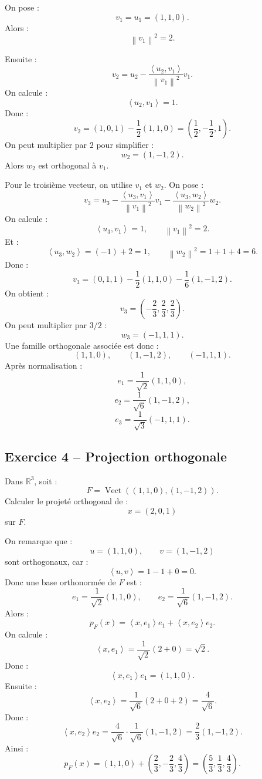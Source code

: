 \documentclass[11pt,a4paper]{article}
\newcommand{\R}{\mathbb R}
\newcommand{\Vect}{\operatorname{Vect}}
\newcommand{\norme}[1]{\left\lVert #1\right\rVert}
\newcommand{\scal}[2]{\left\langle #1,#2\right\rangle}
\begin{document}
\begin{correctionbox}
On pose :
\[
v_1=u_1=(1,1,0).
\]
Alors :
\[
\norme{v_1}^2=2.
\]

Ensuite :
\[
v_2=u_2-\frac{\scal{u_2}{v_1}}{\norme{v_1}^2}v_1.
\]
On calcule :
\[
\scal{u_2}{v_1}=1.
\]
Donc :
\[
v_2=(1,0,1)-\frac12(1,1,0)
=
\left(\frac12,-\frac12,1\right).
\]
On peut multiplier par \(2\) pour simplifier :
\[
w_2=(1,-1,2).
\]
Alors \(w_2\) est orthogonal à \(v_1\).

Pour le troisième vecteur, on utilise \(v_1\) et \(w_2\).  
On pose :
\[
v_3=u_3-\frac{\scal{u_3}{v_1}}{\norme{v_1}^2}v_1
-\frac{\scal{u_3}{w_2}}{\norme{w_2}^2}w_2.
\]
On calcule :
\[
\scal{u_3}{v_1}=1,
\qquad
\norme{v_1}^2=2.
\]
Et :
\[
\scal{u_3}{w_2}=(-1)+2=1,
\qquad
\norme{w_2}^2=1+1+4=6.
\]
Donc :
\[
v_3=(0,1,1)-\frac12(1,1,0)-\frac16(1,-1,2).
\]
On obtient :
\[
v_3=
\left(-\frac23,\frac23,\frac23\right).
\]
On peut multiplier par \(3/2\) :
\[
w_3=(-1,1,1).
\]
Une famille orthogonale associée est donc :
\[
(1,1,0),\qquad (1,-1,2),\qquad (-1,1,1).
\]
Après normalisation :
\[
e_1=\frac1{\sqrt2}(1,1,0),
\]
\[
e_2=\frac1{\sqrt6}(1,-1,2),
\]
\[
e_3=\frac1{\sqrt3}(-1,1,1).
\]
\end{correctionbox}

\subsection*{Exercice 4 -- Projection orthogonale}

\begin{exercicebox}
Dans \(\R^3\), soit :
\[
F=\Vect((1,1,0),(1,-1,2)).
\]
Calculer le projeté orthogonal de :
\[
x=(2,0,1)
\]
sur \(F\).
\end{exercicebox}

\begin{correctionbox}
On remarque que :
\[
u=(1,1,0),
\qquad
v=(1,-1,2)
\]
sont orthogonaux, car :
\[
\scal{u}{v}=1-1+0=0.
\]
Donc une base orthonormée de \(F\) est :
\[
e_1=\frac1{\sqrt2}(1,1,0),
\qquad
e_2=\frac1{\sqrt6}(1,-1,2).
\]
Alors :
\[
p_F(x)=\scal{x}{e_1}e_1+\scal{x}{e_2}e_2.
\]
On calcule :
\[
\scal{x}{e_1}
=
\frac1{\sqrt2}(2+0)=\sqrt2.
\]
Donc :
\[
\scal{x}{e_1}e_1=(1,1,0).
\]
Ensuite :
\[
\scal{x}{e_2}
=
\frac1{\sqrt6}(2+0+2)=\frac4{\sqrt6}.
\]
Donc :
\[
\scal{x}{e_2}e_2
=
\frac4{\sqrt6}\cdot\frac1{\sqrt6}(1,-1,2)
=
\frac23(1,-1,2).
\]
Ainsi :
\[
p_F(x)
=
(1,1,0)+\left(\frac23,-\frac23,\frac43\right)
=
\left(\frac53,\frac13,\frac43\right).
\]
\end{correctionbox}
\end{document}
